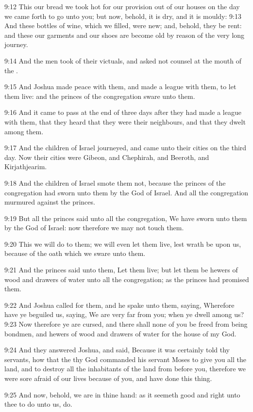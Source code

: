 9:12 This our bread we took hot for our provision out of our houses on
the day we came forth to go unto you; but now, behold, it is dry, and
it is mouldy: 9:13 And these bottles of wine, which we filled, were
new; and, behold, they be rent: and these our garments and our shoes
are become old by reason of the very long journey.

9:14 And the men took of their victuals, and asked not counsel at the
mouth of the \LORD.

9:15 And Joshua made peace with them, and made a league with them, to
let them live: and the princes of the congregation sware unto them.

9:16 And it came to pass at the end of three days after they had made
a league with them, that they heard that they were their neighbours,
and that they dwelt among them.

9:17 And the children of Israel journeyed, and came unto their cities
on the third day. Now their cities were Gibeon, and Chephirah, and
Beeroth, and Kirjathjearim.

9:18 And the children of Israel smote them not, because the princes of
the congregation had sworn unto them by the \LORD God of Israel. And
all the congregation murmured against the princes.

9:19 But all the princes said unto all the congregation, We have sworn
unto them by the \LORD God of Israel: now therefore we may not touch
them.

9:20 This we will do to them; we will even let them live, lest wrath
be upon us, because of the oath which we sware unto them.

9:21 And the princes said unto them, Let them live; but let them be
hewers of wood and drawers of water unto all the congregation; as the
princes had promised them.

9:22 And Joshua called for them, and he spake unto them, saying,
Wherefore have ye beguiled us, saying, We are very far from you; when
ye dwell among us?  9:23 Now therefore ye are cursed, and there shall
none of you be freed from being bondmen, and hewers of wood and
drawers of water for the house of my God.

9:24 And they answered Joshua, and said, Because it was certainly told
thy servants, how that the \LORD thy God commanded his servant Moses to
give you all the land, and to destroy all the inhabitants of the land
from before you, therefore we were sore afraid of our lives because of
you, and have done this thing.

9:25 And now, behold, we are in thine hand: as it seemeth good and
right unto thee to do unto us, do.

